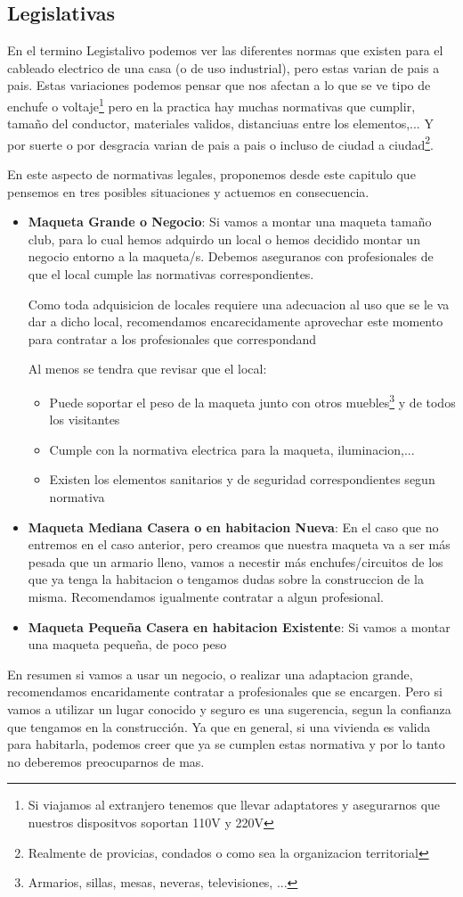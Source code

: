 \subsection{Legislativas}
En el termino Legistalivo podemos ver las diferentes normas que existen para el cableado electrico de una casa (o de uso industrial), pero estas varian de pais a pais. Estas variaciones podemos pensar que nos afectan a lo que se ve tipo de enchufe o voltaje\footnote{Si viajamos al extranjero tenemos que llevar adaptatores y asegurarnos que nuestros dispositvos soportan 110V y 220V}
pero en la practica hay muchas normativas que cumplir, tamaño del conductor, materiales validos, distanciuas entre los elementos,... Y por suerte o por desgracia varian de pais a pais o incluso de ciudad a ciudad\footnote{Realmente de provicias, condados o como sea la organizacion territorial}.

En este aspecto de normativas legales, proponemos desde este capitulo que pensemos en tres posibles situaciones y actuemos en consecuencia.
\begin{itemize}
	\item \textbf{Maqueta Grande o Negocio}: Si vamos a montar una maqueta tamaño club, para lo cual hemos adquirdo un local o hemos decidido montar un negocio entorno a la maqueta/s. Debemos aseguranos con profesionales de que el local cumple las normativas correspondientes.

Como toda adquisicion de locales requiere una adecuacion al uso que se le va dar a dicho local, recomendamos encarecidamente aprovechar este momento para contratar a los profesionales que correspondand

Al menos se tendra que revisar que el local:
	\begin{itemize}
		\item Puede soportar el peso de la maqueta junto con otros muebles\footnote{Armarios, sillas, mesas, neveras, televisiones, ...} y de todos los visitantes
		\item Cumple con la normativa electrica para la maqueta, iluminacion,...
		\item Existen los elementos sanitarios y de seguridad correspondientes segun normativa
	\end{itemize}
	\item \textbf{Maqueta Mediana Casera o en habitacion Nueva}: En el caso que no entremos en el caso anterior, pero creamos que nuestra maqueta va a ser más pesada que un armario lleno, vamos a necestir más enchufes/circuitos de los que ya tenga la habitacion o tengamos dudas sobre la construccion de la misma. Recomendamos igualmente contratar a algun profesional. 
	\item \textbf{Maqueta Pequeña Casera en habitacion Existente}: Si vamos a montar una maqueta pequeña, de poco peso
\end{itemize}
En resumen si vamos a usar un negocio, o realizar una adaptacion grande, recomendamos encaridamente contratar a profesionales que se encargen. Pero si vamos a utilizar un lugar conocido y seguro es una sugerencia, segun la confianza que tengamos en la construcción.
Ya que en general, si una vivienda es valida para habitarla, podemos creer que ya se cumplen estas normativa y por lo tanto no deberemos preocuparnos de mas.

